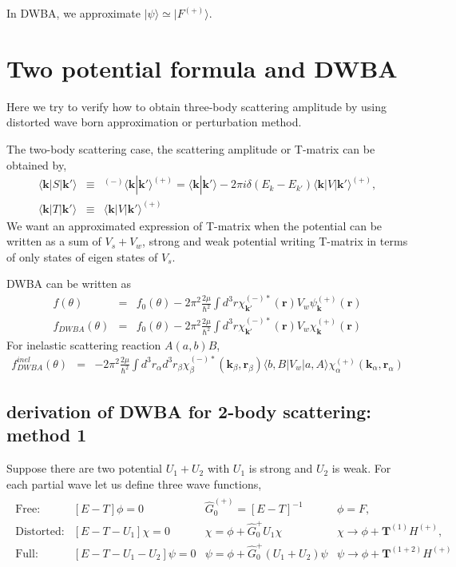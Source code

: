 \documentclass[10pt]{book}
\def\bm{\boldsymbol}
\newcommand{\bea}{\begin{eqnarray}}
\newcommand{\eea}{\end{eqnarray}}
\newcommand{\no}{\nonumber \\}
\def\vk{{\bm k}}
\def\vr{{\bm r}}
\def\la{\langle}
\def\ra{\rangle}
\begin{document}
In DWBA, we approximate $|\psi\ra\simeq |F^{(+)}\ra $.

\section{Two potential formula and DWBA}
Here we try to verify how to obtain three-body 
scattering amplitude by using 
distorted wave born approximation or perturbation method.

The two-body scattering case, the scattering amplitude or
T-matrix can be obtained by,
\bea
\la \vk|S|\vk'\ra&\equiv&{}^{(-)}\la \vk|\vk'\ra^{(+)}
=\la \vk|\vk'\ra-2\pi i\delta(E_k-E_{k'})\la \vk|V|\vk'\ra^{(+)},\no
\la \vk|T|\vk'\ra&\equiv& \la \vk|V|\vk'\ra^{(+)}
\eea
We want an approximated expression of T-matrix when the
potential can be written as a sum of $V_{s}+V_{w}$,
strong and weak potential writing T-matrix in terms of only 
states of eigen states of $V_{s}$.

DWBA can be written as
\bea 
f(\theta)&=&  f_0(\theta)- 2\pi^2\frac{2\mu}{\hbar^2} \int d^3 r \chi^{(-)*}_{\vk'}(\vr) V_{w} \psi_\vk^{(+)}(\vr) \no 
f_{DWBA}(\theta)&=&  f_0(\theta)- 2\pi^2\frac{2\mu}{\hbar^2} \int d^3 r \chi^{(-)*}_{\vk'}(\vr) V_{w} \chi_\vk^{(+)}(\vr)
\eea
For inelastic scattering reaction $A(a,b)B$,
\bea 
f_{DWBA}^{inel}(\theta)&=&- 2\pi^2\frac{2\mu}{\hbar^2} \int d^3 r_\alpha d^3 r_\beta  
\chi^{(-)*}_{\beta}(\vk_\beta,\vr_\beta) \la b,B| V_{w}| a,A\ra \chi_\alpha^{(+)}(\vk_\alpha,\vr_\alpha)
\eea 



\subsection{derivation of DWBA for 2-body scattering: method 1}

Suppose there are two potential $U_1+U_2$ with $U_1$ is strong and $U_2$ is weak.
For each partial wave let us define three wave functions,
\bea
\boxed{
\begin{array}{llll}
\mbox{Free:} & [E-T]\phi=0 & \hat{G}^{(+)}_0=[E-T]^{-1} & \phi=F,\no 
\mbox{Distorted:} & [E-T-U_1]\chi=0 & \chi=\phi+\hat{G}_0^{+}U_1\chi 
     &\chi\to \phi+{\bm T}^{(1)}H^{(+)},\no 
\mbox{Full:} & [E-T-U_1-U_2]\psi=0 & \psi=\phi+\hat{G}_0^{+}(U_1+U_2)\psi 
     &\psi\to \phi+{\bm T}^{(1+2)}H^{(+)}
\end{array}
}
\eea
\end{document}

